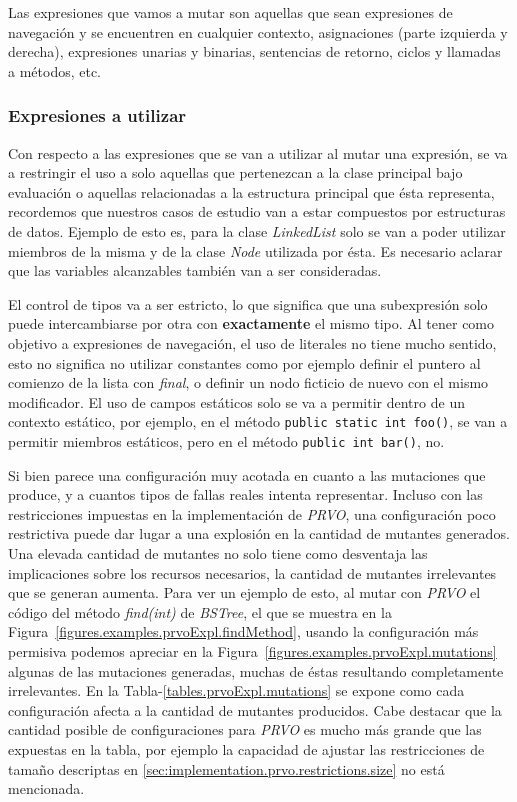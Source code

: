 Las expresiones que vamos a mutar son aquellas que sean expresiones de navegaci\'on y se encuentren en cualquier contexto, asignaciones (parte izquierda y derecha), expresiones unarias y binarias, sentencias de retorno, ciclos y llamadas a m\'etodos, etc.

\subsubsection{Expresiones a utilizar}

Con respecto a las expresiones que se van a utilizar al mutar una expresi\'on, se va a restringir el uso a solo aquellas que pertenezcan a la clase principal bajo evaluaci\'on o aquellas relacionadas a la estructura principal que \'esta representa, recordemos que nuestros casos de estudio van a estar compuestos por estructuras de datos. Ejemplo de esto es, para la clase \emph{LinkedList} solo se van a poder utilizar miembros de la misma y de la clase \emph{Node} utilizada por \'esta. Es necesario aclarar que las variables alcanzables tambi\'en van a ser consideradas.

El control de tipos va a ser estricto, lo que significa que una subexpresi\'on solo puede intercambiarse por otra con \textbf{exactamente} el mismo tipo. Al tener como objetivo a expresiones de navegaci\'on, el uso de literales no tiene mucho sentido, esto no significa no utilizar constantes como por ejemplo definir el puntero al comienzo de la lista con \emph{final}, o definir un nodo ficticio de nuevo con el mismo modificador. El uso de campos est\'aticos solo se va a permitir dentro de un contexto est\'atico, por ejemplo, en el m\'etodo \lstinline|public static int foo()|, se van a permitir miembros est\'aticos, pero en el m\'etodo \lstinline|public int bar()|, no.

Si bien parece una configuraci\'on muy acotada en cuanto a las mutaciones que produce, y a cuantos tipos de fallas reales intenta representar. Incluso con las restricciones impuestas en la implementaci\'on de \emph{PRVO}, una configuraci\'on poco restrictiva puede dar lugar a una explosi\'on en la cantidad de mutantes generados. Una elevada cantidad de mutantes no solo tiene como desventaja las implicaciones sobre los recursos necesarios, la cantidad de mutantes irrelevantes que se generan aumenta. Para ver un ejemplo de esto, al mutar con \emph{PRVO} el c\'odigo del m\'etodo \emph{find(int)} de \emph{BSTree}, el que se muestra en la Figura~\ref{figures.examples.prvoExpl.findMethod}, usando la configuraci\'on m\'as permisiva podemos apreciar en la Figura~\ref{figures.examples.prvoExpl.mutations} algunas de las mutaciones generadas, muchas de \'estas resultando completamente irrelevantes. En la Tabla-\ref{tables.prvoExpl.mutations} se expone como cada configuraci\'on afecta a la cantidad de mutantes producidos. Cabe destacar que la cantidad posible de configuraciones para \emph{PRVO} es mucho m\'as grande que las expuestas en la tabla, por ejemplo la capacidad de ajustar las restricciones de tama\~no descriptas en \ref{sec:implementation.prvo.restrictions.size} no est\'a mencionada.

